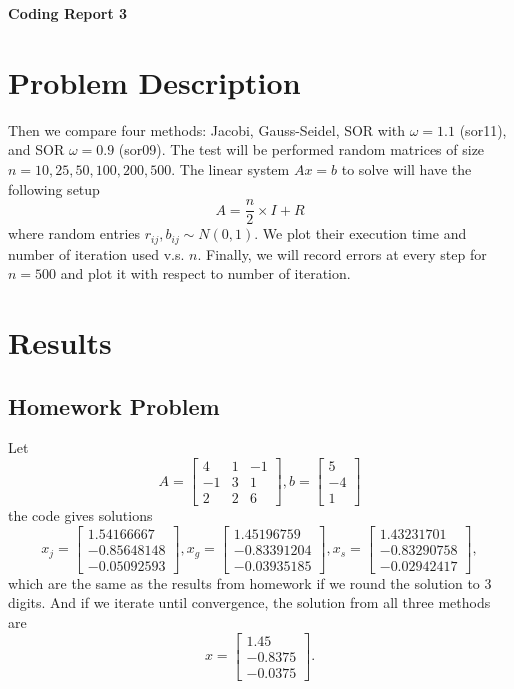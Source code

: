 \documentclass[a4paper,12pt]{article}
\begin{document}
\begin{center} %
	{\Large \bf Coding Report 3} %
	\vspace{2mm}
\end{center}  


\section{Problem Description}

Then we compare four methods: Jacobi, Gauss-Seidel, SOR with $\omega = 1.1$ (sor11), and SOR $\omega = 0.9$ (sor09).
The test will be performed random matrices of size $n = 10, 25, 50, 100, 200, 500$.
The linear system $Ax = b$ to solve will have the following setup
$$
A = \frac{n}{2} \times I + R
$$
where random entries $r_{ij}, b_{ij} \sim N(0, 1)$.
We plot their execution time and number of iteration used v.s. $n$.
Finally, we will record errors at every step for $n = 500$ 
and plot it with respect to number of iteration.

\section{Results}

\subsection{Homework Problem}
Let 
$$
A = \begin{bmatrix}
	4 & 1 & -1 \\
	-1 & 3 & 1 \\
	2 & 2 & 6
\end{bmatrix},
b = \begin{bmatrix}
	5 \\ -4 \\ 1
\end{bmatrix}
$$
the code gives solutions
$$
x_j = \begin{bmatrix}
	 1.54166667 \\
	-0.85648148 \\
	-0.05092593 
\end{bmatrix},
x_g = \begin{bmatrix}
	 1.45196759 \\
	-0.83391204 \\
	-0.03935185 
\end{bmatrix},
x_s = \begin{bmatrix}
	 1.43231701 \\
	-0.83290758 \\
	-0.02942417 
\end{bmatrix},
$$
which are the same as the results from homework if we round the solution to 3 digits.
And if we iterate until convergence, the solution from all three methods are
$$
x = \begin{bmatrix}
	 1.45   \\
	-0.8375 \\
	-0.0375
\end{bmatrix}.
$$
\end{document}
